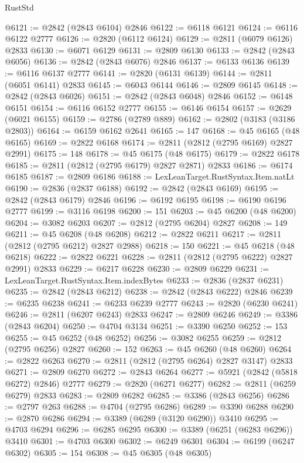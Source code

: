 \begin{lexlean}{RustStd}
\begin{coremodule}
{\begin{coremodule}
{{{{{{{{{{{{{{{{{{{{{{{{{{{{{{{{{@6121 := @2842 (@2843 @6104) @2846
@6122 := @6118 @6121
@6124 := @6116 @6122 @2777
@6126 := @2820 (@6112 @6124)
@6129 := @2811 (@6079 @6126) @2833
@6130 := @6071 @6129
@6131 := @2809 @6130
@6133 := @2842 (@2843 @6056)
@6136 := @2842 (@2843 @6076) @2846
@6137 := @6133 @6136
@6139 := @6116 @6137 @2777
@6141 := @2820 (@6131 @6139)
@6144 := @2811 (@6051 @6141) @2833
@6145 := @6043 @6144
@6146 := @2809 @6145
@6148 := @2842 (@2843 @6026)
@6151 := @2842 (@2843 @6048) @2846
@6152 := @6148 @6151
@6154 := @6116 @6152 @2777
@6155 := @6146 @6154
@6157 := @2629 (@6021 @6155)
@6159 := @2786 (@2789 @889)
@6162 := @2802 (@3183 (@3186 @2803))
@6164 := @6159 @6162 @2641
@6165 := 147
@6168 := @45 @6165 (@48 @6165)
@6169 := @2822 @6168
@6174 := @2811 (@2812 (@2795 @6169) @2827 @2991)
@6175 := 148
@6178 := @45 @6175 (@48 @6175)
@6179 := @2822 @6178
@6185 := @2811 (@2812 (@2795 @6179) @2827 @2871) @2833
@6186 := @6174 @6185
@6187 := @2809 @6186
@6188 := LexLeanTarget.RustSyntax.Item.natLt
@6190 := @2836 (@2837 @6188)
@6192 := @2842 (@2843 @6169)
@6195 := @2842 (@2843 @6179) @2846
@6196 := @6192 @6195
@6198 := @6190 @6196 @2777
@6199 := @3116 @6198
@6200 := 151
@6203 := @45 @6200 (@48 @6200)
@6204 := @3082 @6203
@6207 := @2812 (@2795 @6204) @2827
@6208 := 149
@6211 := @45 @6208 (@48 @6208)
@6212 := @2822 @6211
@6217 := @2811 (@2812 (@2795 @6212) @2827 @2988)
@6218 := 150
@6221 := @45 @6218 (@48 @6218)
@6222 := @2822 @6221
@6228 := @2811 (@2812 (@2795 @6222) @2827 @2991) @2833
@6229 := @6217 @6228
@6230 := @2809 @6229
@6231 := LexLeanTarget.RustSyntax.Item.indexBytes
@6233 := @2836 (@2837 @6231)
@6235 := @2842 (@2843 @6212)
@6238 := @2842 (@2843 @6222) @2846
@6239 := @6235 @6238
@6241 := @6233 @6239 @2777
@6243 := @2820 (@6230 @6241)
@6246 := @2811 (@6207 @6243) @2833
@6247 := @2809 @6246
@6249 := @3386 (@2843 @6204)
@6250 := @4704 @3134
@6251 := @3390 @6250
@6252 := 153
@6255 := @45 @6252 (@48 @6252)
@6256 := @3082 @6255
@6259 := @2812 (@2795 @6256) @2827
@6260 := 152
@6263 := @45 @6260 (@48 @6260)
@6264 := @2822 @6263
@6270 := @2811 (@2812 (@2795 @6264) @2827 @3147) @2833
@6271 := @2809 @6270
@6272 := @2843 @6264
@6277 := @5921 (@2842 (@5818 @6272) @2846) @2777
@6279 := @2820 (@6271 @6277)
@6282 := @2811 (@6259 @6279) @2833
@6283 := @2809 @6282
@6285 := @3386 (@2843 @6256)
@6286 := @2797 @263
@6288 := @4704 (@2795 @6286)
@6289 := @3390 @6288
@6290 := @2870 @6286
@6294 := @3389 (@6289 (@3120 @6290)) @3410
@6295 := @4703 @6294
@6296 := @6285 @6295
@6300 := @3389 (@6251 (@6283 @6296)) @3410
@6301 := @4703 @6300
@6302 := @6249 @6301
@6304 := @6199 (@6247 @6302)
@6305 := 154
@6308 := @45 @6305 (@48 @6305)
}}}}}}}}}}}}}}}}}}}}}}}}}}}}}}}}}
\end{coremodule}}
\end{coremodule}
\end{lexlean}
